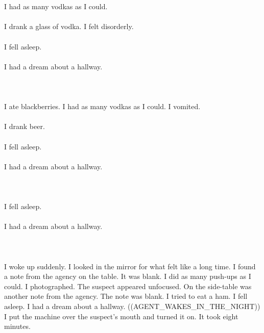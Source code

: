 \documentclass{article}
\begin{document}
    \section{}
    I had as many vodkas as I could.\\\\I drank a glass of vodka. I felt disorderly.\\\\I fell asleep.\\\\I had a dream about a hallway.\\\\ 
    \newpage
    
    \section{}
    I ate blackberries. I had as many vodkas as I could. I vomited.\\\\I drank beer.\\\\I fell asleep.\\\\I had a dream about a hallway.\\\\ 
    \newpage
    
    \section{}
    I fell asleep.\\\\I had a dream about a hallway.\\\\ 
    \newpage
    
    \section{}
    I woke up suddenly. I looked in the mirror for what felt like a long time. I found a note from the agency on the table. It was blank. I did as many push-ups as I could. I photographed. The suspect appeared unfocused. On the side-table was another note from the agency. The note was blank. I tried to eat a ham. I fell asleep. I had a dream about a hallway. ((AGENT_WAKES_IN_THE_NIGHT)) I put the machine over the suspect's mouth and turned it on. It took eight minutes. \\\\
    \newpage
    
\end{document}

